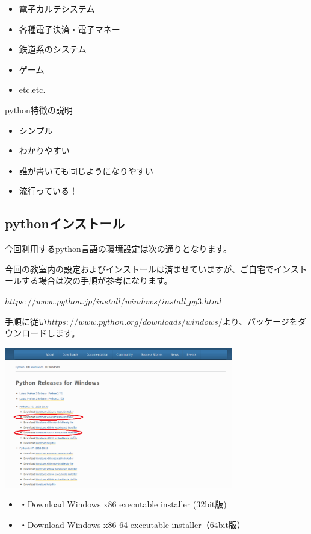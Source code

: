 \documentclass[11pt,a4paper,dvipdfmx,titlepage]{jsreport}
\begin{document}
\begin{itemize}
 \item 電子カルテシステム 
 \item 各種電子決済・電子マネー
 \item 鉄道系のシステム
 \item ゲーム
 \item etc.etc.
\end{itemize}

python特徴の説明
\begin{itemize}
 \item シンプル
 \item わかりやすい
 \item 誰が書いても同じようになりやすい
 \item 流行っている！
\end{itemize}

\subsection{pythonインストール}
今回利用するpython言語の環境設定は次の通りとなります。

今回の教室内の設定およびインストールは済ませていますが、ご自宅でインストールする場合は次の手順が参考になります。

\begin{description}
	\item $https://www.python.jp/install/windows/install\_py3.html$
\end{description}

手順に従い$https://www.python.org/downloads/windows/$より、パッケージをダウンロードします。

\includegraphics[width=10cm]{images/image11.png}

\begin{itemize}
	\item ・Download Windows x86 executable installer (32bit版)
	\item ・Download Windows x86-64 executable installer（64bit版）

\end{itemize}
\end{document}
